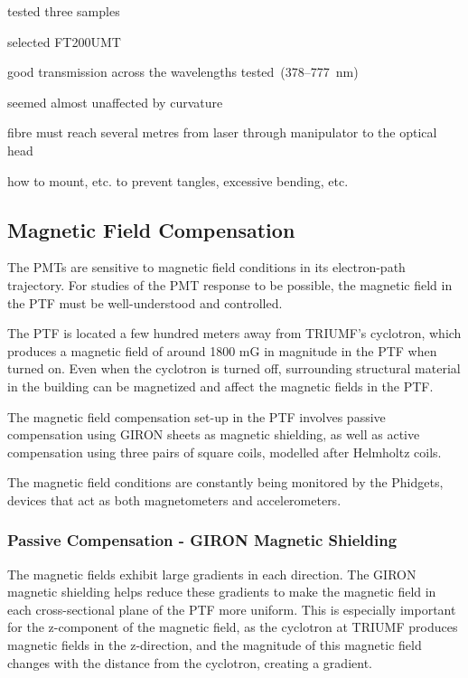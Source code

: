 tested three samples

selected FT200UMT

good transmission across the wavelengths tested~(378--777~nm)

seemed almost unaffected by curvature

fibre must reach several metres from laser through manipulator to the
optical head

how to mount, etc. to prevent tangles, excessive bending, etc.


\subsection{Magnetic Field Compensation}
\label{Sec:MagFieldCompensation}

The PMTs are sensitive to magnetic field conditions in its electron-path trajectory. For studies of the PMT response to be possible, the magnetic field in the PTF must be well-understood and controlled.

The PTF is located a few hundred meters away from TRIUMF's cyclotron, which produces a magnetic field of around 1800 mG in magnitude in the PTF when turned on. Even when the cyclotron is turned off, surrounding structural material in the building can be magnetized and affect the magnetic fields in the PTF.

The magnetic field compensation set-up in the PTF involves passive compensation using GIRON sheets as magnetic shielding, as well as active compensation using three pairs of square coils, modelled after Helmholtz coils.

The magnetic field conditions are constantly being monitored by the Phidgets, devices that act as both magnetometers and accelerometers.

\subsubsection{Passive Compensation - GIRON Magnetic Shielding}

The magnetic fields exhibit large gradients in each direction. The GIRON magnetic shielding helps reduce these gradients to make the magnetic field in each cross-sectional plane of the PTF more uniform. This is especially important for the z-component of the magnetic field, as the cyclotron at TRIUMF produces magnetic fields in the z-direction, and the magnitude of this magnetic field changes with the distance from the cyclotron, creating a gradient.

